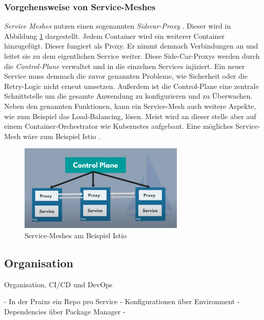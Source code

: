\subsubsection{Vorgehensweise von Service-Meshes}
\textit{Service Meshes} nutzen einen sogenannten \textit{Sidecar-Proxy} \cite{codingwithnana_istio_nodate}. Dieser wird in Abbildung \ref{fig:service-mesh} dargestellt. Jedem Container wird ein weiterer Container hinzugefügt. Dieser fungiert als Proxy. Er nimmt demnach Verbindungen an und leitet sie zu dem eigentlichen Service weiter. Diese Side-Car-Proxys werden durch die \textit{Control-Plane} verwaltet und in die einzelnen Services injiziert. Ein neuer Service muss demnach die zuvor genannten Probleme, wie Sicherheit oder die Retry-Logic nicht erneut umsetzen. Außerdem ist die Control-Plane eine zentrale Schnittstelle um die gesamte Anwendung zu konfigurieren und zu Überwachen. Neben den genannten Funktionen, kann ein Service-Mesh auch weitere Aspekte, wie zum Beispiel das Load-Balancing, lösen. Meist wird an dieser stelle aber auf einem Container-Orchestrator wie Kubernetes \cite{kubernetes_production-grade_nodate} aufgebaut. Eine mögliches Service-Mesh wäre zum Beispiel Istio \cite{istio_istio_nodate}. 
\begin{figure}[bth] 
  \centering
  \includegraphics[width=0.7\textwidth]{Chapters/2-Grundlagen/Graphics/service-meshes.png}
  \caption{Service-Meshes am Beispiel Istio \cite{codingwithnana_istio_nodate}}
  \label{fig:service-mesh}
\end{figure}

\subsection{Organisation}

Organisation, CI/CD und DevOps

- In der Praixs ein Repo pro Service
- Konfigurationen über Environment
- Dependencies über Package Manager
- 
